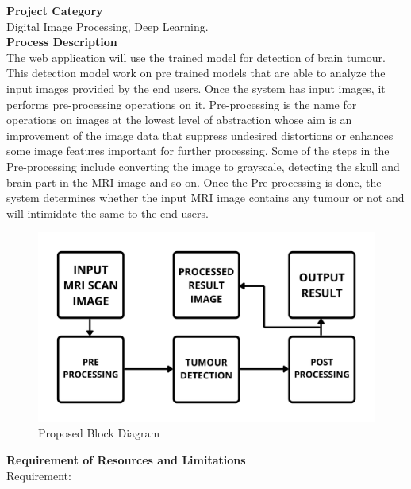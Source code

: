{\bf \Large Project Category}\\
Digital Image Processing, Deep Learning.\\
{\bf \Large Process Description}\\
The web application will use the trained model for detection of brain tumour. This detection model work on pre trained models that are able to analyze the input images provided by the end users. Once the system has input images, it performs pre-processing operations on it. Pre-processing is the name for operations on images at the lowest level of abstraction whose aim is an improvement of the image data that suppress undesired distortions or enhances some image features important for further processing. Some of the steps in the Pre-processing include converting the image to grayscale, detecting the skull and brain part in the MRI image and so on. Once the Pre-processing is done, the system determines whether the input MRI image contains any tumour or not and will intimidate the same to the end users. \\
\begin{figure}[H]
  \includegraphics[scale=0.3]{brain_block.png}
  \caption{Proposed Block Diagram} \label{fig:ishan}
\end{figure}
{\bf \Large Requirement of Resources and Limitations}\\
Requirement:
